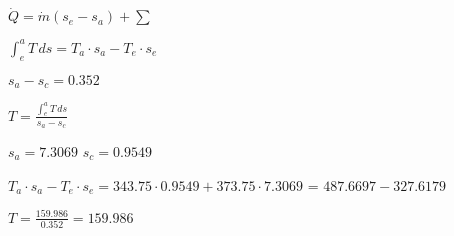 \( \dot{Q} = \dot{m} (s_e - s_a) + \sum \)  

\( \int_e^a T \, ds = T_a \cdot s_a - T_e \cdot s_e \)  

\( s_a - s_c = 0.352 \)  

\( T = \frac{\int_e^a T \, ds}{s_a - s_c} \)  

\( s_a = 7.3069 \)  
\( s_c = 0.9549 \)  

\( T_a \cdot s_a - T_e \cdot s_e = 343.75 \cdot 0.9549 + 373.75 \cdot 7.3069 \)  
= \( 487.6697 - 327.6179 \)  

\( T = \frac{159.986}{0.352} = 159.986 \)